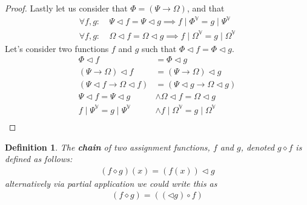 \documentclass{article}
\newtheorem{defin}{Definition}
\begin{document}
\begin{proof}
Lastly let us consider that $\Phi = (\Psi\rightarrow\Omega)$, and that
\begin{align*}
\forall f,g: & \: \Psi   \lhd f = \Psi   \lhd g \implies f\mid\Phi^\mathbb{V}  =g\mid\Psi^\mathbb{V}   \\
\forall f,g: & \: \Omega \lhd f = \Omega \lhd g \implies f\mid\Omega^\mathbb{V}=g\mid\Omega^\mathbb{V}
\end{align*}
Let's consider two functions $f$ and $g$ such that $\Phi\lhd f=\Phi\lhd g$.
\begin{align*}
\Phi\lhd f                          &= \Phi\lhd g                              \\
(\Psi\rightarrow\Omega)\lhd f       &= (\Psi\rightarrow\Omega)\lhd g           \\
(\Psi\lhd f\rightarrow\Omega\lhd f) &= (\Psi\lhd g\rightarrow\Omega\lhd g)     \\
\Psi\lhd f = \Psi\lhd g             &\land \Omega\lhd f = \Omega\lhd g         \\
f\mid\Psi^\mathbb{V} = g\mid\Psi^\mathbb{V}     &\land f\mid\Omega^\mathbb{V} = g\mid\Omega^\mathbb{V} \\
\end{align*}

\end{proof}

\begin{defin}
The \textbf{chain} of two assignment functions, $f$ and $g$, denoted $g \diamond f$ is defined as follows:
\begin{align*}
(f \diamond g) (x) = (f (x)) \lhd g
\end{align*}
alternatively via partial application we could write this as
\begin{align*}
(f \diamond g) = ((\lhd g)\circ f)
\end{align*}
\end{defin}
\end{document}
